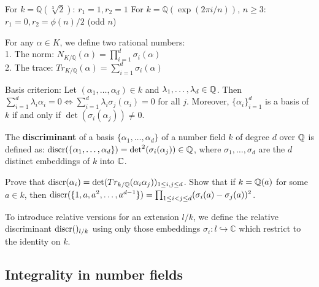 \begin{outline}
            \2 For $k = \mathbb{Q}(\sqrt[3]{2})$: $r_1 = 1, r_2 = 1$
            \2 For $k = \mathbb{Q}(\exp(2\pi i/n))$, $n \geq 3$: $r_1 = 0, r_2 = \phi(n)/2$ (odd $n$)
    \0 \begin{definition}
        For any $\alpha \in K$, we define two rational numbers:\\
        1. The norm: $N_{K/\mathbb{Q}}(\alpha) = \prod_{i=1}^d \sigma_i(\alpha)$\\
        2. The trace: $Tr_{K/\mathbb{Q}}(\alpha) = \sum_{i=1}^d \sigma_i(\alpha)$
    \end{definition}
        \1 Basis criterion: Let $(\alpha_1,\ldots,\alpha_d)\in k$ and $\lambda_1,\ldots,\lambda_d\in\mathbb{Q}$. Then $\sum_{i=1}^d \lambda_i\alpha_i = 0 \iff \sum_{i=1}^d \lambda_i \sigma_j(\alpha_i)=0$ for all $j$. 
        Moreover, $\{\alpha_i\}_{i=1}^d$ is a basis of $k$ if and only if $\det(\sigma_i(\alpha_j))\neq 0$.
    \0 \begin{definition}
        The \textbf{discriminant} of a basis $\{\alpha_1,\ldots,\alpha_d\}$ of a number field $k$ of degree $d$ over $\mathbb{Q}$ is defined as: $\operatorname{discr}({\{\alpha_1,\ldots,\alpha_d\}})=\det^2(\sigma_i(\alpha_j))\in\mathbb{Q}$, where $\sigma_1,\ldots,\sigma_d$ are the $d$ distinct embeddings of $k$ into $\mathbb{C}$.
    \end{definition}
    \begin{exercise}
        Prove that $\operatorname{discr}({\alpha_i}) = \det(Tr_{k/\mathbb{Q}}(\alpha_i\alpha_j))_{1 \leq i,j \leq d}$. Show that if $k = \mathbb{Q}(a)$ for some $a \in k$, then $\operatorname{discr}({\{1,a,a^2,\ldots,a^{d-1}\}}) = \prod_{1 \leq i < j \leq d}(\sigma_i(a)-\sigma_j(a))^2$.
    \end{exercise}
    \0 To introduce relative versions for an extension $l/k$, we define the relative discriminant $\operatorname{discr}({})_{l/k}$ using only those embeddings $\sigma_i : l \hookrightarrow \mathbb{C}$ which restrict to the identity on $k$.
\end{outline}

\subsection{Integrality in number fields}

